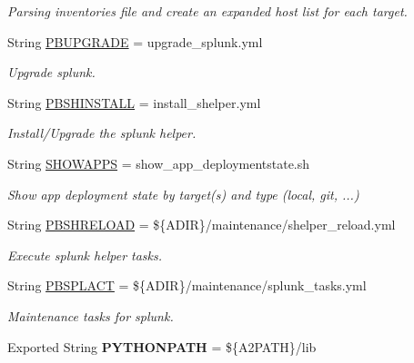 \begin{DoxyCompactItemize}
\begin{DoxyCompactList}\small\item\em Parsing inventories file and create an expanded host list for each target. \end{DoxyCompactList}\item 
\mbox{\label{ansible__engine_8sh_a40bf4e7ce006ccfc3a6cb8aa66e088df}} 
String \mbox{\hyperlink{ansible__engine_8sh_a40bf4e7ce006ccfc3a6cb8aa66e088df}{P\+B\+U\+P\+G\+R\+A\+DE}} = upgrade\+\_\+splunk.\+yml
\begin{DoxyCompactList}\small\item\em Upgrade splunk. \end{DoxyCompactList}\item 
String \mbox{\hyperlink{ansible__engine_8sh_a63fb318d1ba289777a689f021cfb4434}{P\+B\+S\+H\+I\+N\+S\+T\+A\+LL}} = install\+\_\+shelper.\+yml
\begin{DoxyCompactList}\small\item\em Install/\+Upgrade the splunk helper. \end{DoxyCompactList}\item 
\mbox{\label{ansible__engine_8sh_aa8b6c14970a3d4f412f9e6cca56ca23f}} 
String \mbox{\hyperlink{ansible__engine_8sh_aa8b6c14970a3d4f412f9e6cca56ca23f}{S\+H\+O\+W\+A\+P\+PS}} = show\+\_\+app\+\_\+deploymentstate.\+sh
\begin{DoxyCompactList}\small\item\em Show app deployment state by target(s) and type (local, git, ...) \end{DoxyCompactList}\item 
String \mbox{\hyperlink{ansible__engine_8sh_a5abc6709ccffb498c492099b1770c0d6}{P\+B\+S\+H\+R\+E\+L\+O\+AD}} = \$\{A\+D\+IR\}/maintenance/shelper\+\_\+reload.\+yml
\begin{DoxyCompactList}\small\item\em Execute splunk helper tasks. \end{DoxyCompactList}\item 
String \mbox{\hyperlink{ansible__engine_8sh_a07a65ca55f4f8bec6ba69c3d4f05db1c}{P\+B\+S\+P\+L\+A\+CT}} = \$\{A\+D\+IR\}/maintenance/splunk\+\_\+tasks.\+yml
\begin{DoxyCompactList}\small\item\em Maintenance tasks for splunk. \end{DoxyCompactList}\item 
\mbox{\label{ansible__engine_8sh_aa303602d6c6a608b35e3c950471b05bd}} 
Exported String {\bfseries P\+Y\+T\+H\+O\+N\+P\+A\+TH} = \$\{A2\+P\+A\+TH\}/lib
\end{DoxyCompactItemize}


